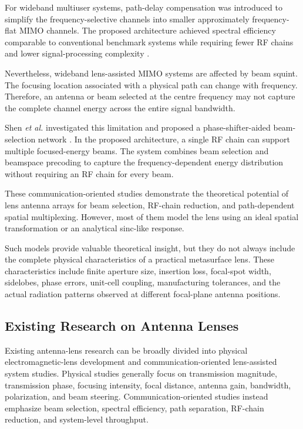 For wideband multiuser systems, path-delay compensation was introduced
to simplify the frequency-selective channels into smaller
approximately frequency-flat MIMO channels. The proposed architecture
achieved spectral efficiency comparable to conventional benchmark
systems while requiring fewer RF chains and lower signal-processing
complexity \cite{Zeng2018}.

Nevertheless, wideband lens-assisted MIMO systems are affected by beam
squint. The focusing location associated with a physical path can
change with frequency. Therefore, an antenna or beam selected at the
centre frequency may not capture the complete channel energy across
the entire signal bandwidth.

Shen \textit{et al.} investigated this limitation and proposed a
phase-shifter-aided beam-selection network
\cite{Shen2019}. In the proposed architecture, a single RF
chain can support multiple focused-energy beams. The system combines
beam selection and beamspace precoding to capture the
frequency-dependent energy distribution without requiring an RF
chain for every beam.

These communication-oriented studies demonstrate the theoretical
potential of lens antenna arrays for beam selection, RF-chain
reduction, and path-dependent spatial multiplexing. However, most of
them model the lens using an ideal spatial transformation or an
analytical sinc-like response.

Such models provide valuable theoretical insight, but they do not
always include the complete physical characteristics of a practical
metasurface lens. These characteristics include finite aperture size,
insertion loss, focal-spot width, sidelobes, phase errors, unit-cell
coupling, manufacturing tolerances, and the actual radiation patterns
observed at different focal-plane antenna positions.


\subsection{Existing Research on Antenna Lenses}
\label{subsec:existing_antenna_lens_research}

Existing antenna-lens research can be broadly divided into physical
electromagnetic-lens development and communication-oriented
lens-assisted system studies. Physical studies generally focus on
transmission magnitude, transmission phase, focusing intensity, focal
distance, antenna gain, bandwidth, polarization, and beam steering.
Communication-oriented studies instead emphasize beam selection,
spectral efficiency, path separation, RF-chain reduction, and
system-level throughput.

